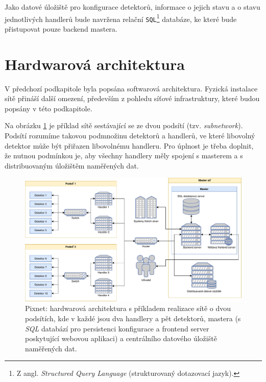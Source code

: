 Jako datové úložiště pro konfigurace detektorů, informace o jejich stavu a o stavu jednotlivých handlerů bude navržena relační \texttt{SQL}\footnote{Z angl. \textit{Structured Query Language} (strukturovaný dotazovací jazyk).} databáze, ke které bude přistupovat pouze backend mastera.

\section{Hardwarová architektura}
V předchozí podkapitole byla popsána softwarová architektura. Fyzická instalace sítě přináší další omezení, především z pohledu síťové infrastruktury, které budou popsány v této podkapitole.

Na obrázku \ref{fig:arch:hw_architecture} je příklad sítě sestávající se ze dvou podsítí (tzv. \textit{subnetwork}). Podsítí rozumíme takovou podmnožinu detektorů a handlerů, ve které libovolný detektor může být přiřazen libovolnému handleru. Pro úplnost je třeba doplnit, že nutnou podmínkou je, aby všechny handlery měly spojení s masterem a s distribuovaným úložištěm naměřených dat.

\begin{figure}[h]
	\begin{center}
		\includegraphics[width=15cm]{figures/arch_hw.pdf}
		\caption{Pixnet: hardwarová architektura s příkladem realizace sítě o dvou podsítích, kde v každé jsou dva handlery a pět detektorů, mastera (s \textit{SQL} databází pro persistenci konfigurace a frontend server poskytující webovou aplikaci) a centrálního datového úložiště naměřených dat.}
		\label{fig:arch:hw_architecture}
	\end{center}
\end{figure}

